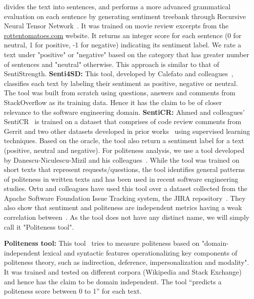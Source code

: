 divides the text into sentences, 
and performs a more advanced grammatical evaluation 
on each sentence 
by generating sentiment treebank 
through Recursive Neural Tensor Network~\cite{socher2013recursive}.
It was trained on movie review excerpts 
from the \url{rottentomatoes.com} website. 
It returns an integer score for each sentence 
(0 for neutral, 1 for positive, -1 for negative) 
indicating its sentiment label. 
We rate a text under "positive" or "negative" 
based on the category that has greater number of sentences 
and "neutral" otherwise. 
This approach is similar to that of SentiStrength.
\newline
\indent\textbf{Senti4SD:} This tool, 
developed by Calefato and colleagues~\cite{calefato2017sentiment}, classifies each text by labeling their sentiment 
as positive, negative or neutral.
The tool was built
from scratch using 
questions, answers and comments 
from StackOverflow as its training data. 
Hence it has the claim to be of closer relevance to 
the software engineering domain.
\newline
\indent \textbf{SentiCR:} Ahmed and colleagues' SentiCR~\cite{ahmed2017senticr} 
is trained on a dataset 
that comprises of 
code review comments from Gerrit and 
two other datasets developed 
in prior works~\cite{calefato2017sentiment,ortu2016emotional} 
using supervised learning techniques. 
Based on the oracle, 
the tool also return a sentiment label 
for a text 
(positive, neutral and negative).
\newline
\newline
For politeness analysis, we use a tool developed by Danescu-Nicu\-lescu-Mizil and his colleagues~\cite{danescu2013computational}. 
While the tool was trained on short texts 
that represent requests/questions, 
the tool identifies general patterns of politeness 
in written texts and 
has been used in recent software engineering studies.
Ortu and colleagues have used this tool 
over a dataset collected from 
the Apache Software Foundation Issue Tracking system, 
the JIRA repository~\cite{ortu2015would,ortu2015bullies}. 
They also show that sentiment and politeness 
are independent metrics having a weak correlation between~\cite{ortu2015bullies}. 
As the tool does not have any distinct name, 
we will simply call it "Politeness tool". 

\textbf{Politeness tool:} This tool~\cite{danescu2013computational} tries to measure politeness based on 
"domain-independent lexical and syntactic features 
operationalizing key components of politeness theory, 
such as indirection, deference, impersonalization and modality". 
It was trained and tested 
on different corpora (Wikipedia and Stack Exchange) 
and hence has the claim to be domain independent. 
The tool ``predicts a politeness score between 0 to 1'' 
for each text.   

